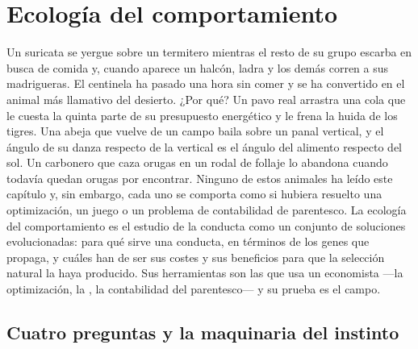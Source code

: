 \chapter{Ecología del comportamiento}\label{ch:b3:behavioural-ecology}

Un suricata se yergue sobre un termitero mientras el resto de su grupo
escarba en busca de comida y, cuando aparece un halcón, ladra y los
demás corren a sus madrigueras. El centinela ha pasado una hora sin
comer y se ha convertido en el animal más llamativo del desierto. ¿Por
qué? Un pavo real arrastra una cola que le cuesta la quinta parte de su
presupuesto energético y le frena la huida de los tigres. Una abeja que
vuelve de un campo baila sobre un panal vertical, y el ángulo de su
danza respecto de la vertical es el ángulo del alimento respecto del
sol. Un carbonero que caza orugas en un rodal de follaje lo abandona
cuando todavía quedan orugas por encontrar. Ninguno de estos animales ha
leído este capítulo y, sin embargo, cada uno se comporta como si hubiera
resuelto una optimización, un juego o un problema de contabilidad de
parentesco. La ecología del comportamiento es el estudio de la conducta
como un conjunto de soluciones evolucionadas: para qué sirve una
conducta, en términos de los genes que propaga, y cuáles han de ser sus
costes y sus beneficios para que la selección natural la haya producido.
Sus herramientas son las que usa un economista ---la optimización, la
, la contabilidad del parentesco--- y su prueba es el
campo.

\section{Cuatro preguntas y la maquinaria del instinto}

